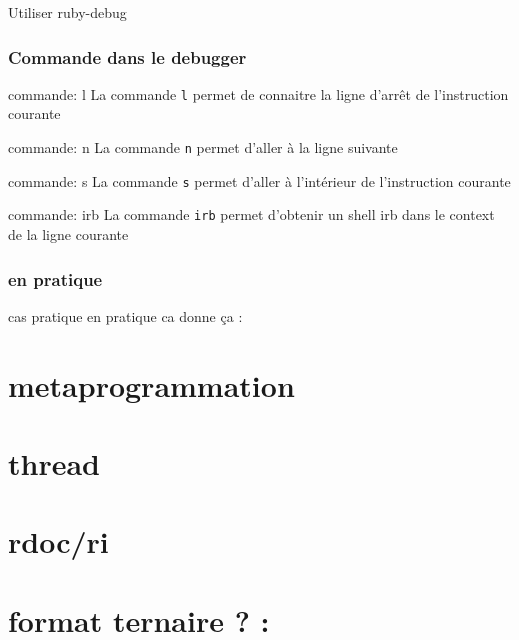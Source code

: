\documentclass{beamer}
\begin{document}
\begin{frame}
  \begin{beamerboxesrounded}{Utiliser ruby-debug}
    
  \end{beamerboxesrounded}
\end{frame}

\begin{frame}
  \frametitle{Commande dans le debugger}
  \begin{block}{commande: l}
    La commande \verb?l? permet de connaitre la ligne d'arrêt de l'instruction courante
  \end{block}
  \begin{block}{commande: n}
    La commande \verb?n? permet d'aller à la ligne suivante
  \end{block}
  \begin{block}{commande: s}
    La commande \verb?s? permet d'aller à l'int\'erieur de l'instruction courante
  \end{block}
  \begin{block}{commande: irb}
    La commande \verb?irb? permet d'obtenir un shell irb dans le context de la ligne courante
  \end{block}
\end{frame}

\begin{frame}
  \frametitle{en pratique}
  \begin{block}{cas pratique}
    en pratique ca donne ça :
  \end{block}
\end{frame}

\section{metaprogrammation}
\section{thread}
\section{rdoc/ri}
\section{format ternaire ? :}
\end{document}

